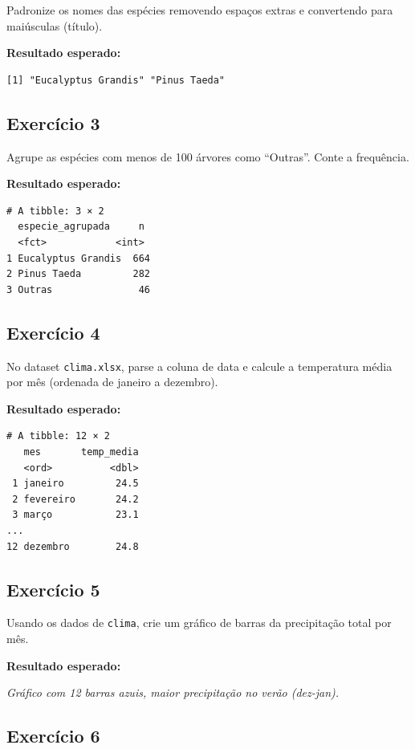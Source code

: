\documentclass[
  letterpaper,
]{scrbook}
\begin{document}
Padronize os nomes das espécies removendo espaços extras e convertendo
para maiúsculas (título).

\textbf{Resultado esperado:}

\begin{verbatim}
[1] "Eucalyptus Grandis" "Pinus Taeda"
\end{verbatim}

\subsection{Exercício 3}\label{exercuxedcio-3-10}

Agrupe as espécies com menos de 100 árvores como ``Outras''. Conte a
frequência.

\textbf{Resultado esperado:}

\begin{verbatim}
# A tibble: 3 × 2
  especie_agrupada     n
  <fct>            <int>
1 Eucalyptus Grandis  664
2 Pinus Taeda         282
3 Outras               46
\end{verbatim}

\subsection{Exercício 4}\label{exercuxedcio-4-7}

No dataset \texttt{clima.xlsx}, parse a coluna de data e calcule a
temperatura média por mês (ordenada de janeiro a dezembro).

\textbf{Resultado esperado:}

\begin{verbatim}
# A tibble: 12 × 2
   mes       temp_media
   <ord>          <dbl>
 1 janeiro         24.5
 2 fevereiro       24.2
 3 março           23.1
...
12 dezembro        24.8
\end{verbatim}

\subsection{Exercício 5}\label{exercuxedcio-5-4}

Usando os dados de \texttt{clima}, crie um gráfico de barras da
precipitação total por mês.

\textbf{Resultado esperado:}

\emph{Gráfico com 12 barras azuis, maior precipitação no verão
(dez-jan).}

\subsection{Exercício 6}\label{exercuxedcio-6-2}
\end{document}
